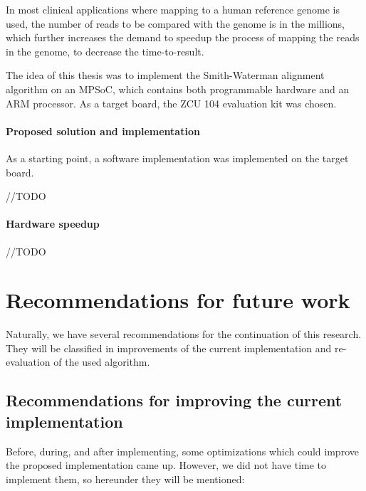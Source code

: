 In most clinical applications where mapping to a human reference genome is used, the number of reads to be compared with the genome is in the millions, which further increases the demand to speedup the process of mapping the reads in the genome, to decrease the time-to-result.

The idea of this thesis was to implement the Smith-Waterman alignment algorithm on an MPSoC, which contains both programmable hardware and an ARM processor. As a target board, the ZCU 104 evaluation kit was chosen.

\paragraph{Proposed solution and implementation}

As a starting point, a software implementation was implemented on the target board.

//TODO

\paragraph{Hardware speedup}

//TODO



\section{Recommendations for future work}

Naturally, we have several recommendations for the continuation of this research. They will be classified in improvements of the current implementation and re-evaluation of the used algorithm.

\subsection{Recommendations for improving the current implementation}

Before, during, and after implementing, some optimizations which could improve the proposed implementation came up. However, we did not have time to implement them, so hereunder they will be mentioned:

